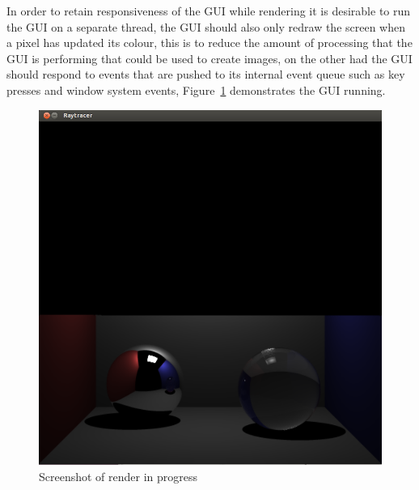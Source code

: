 In order to retain responsiveness of the GUI while rendering it is desirable to run the GUI on a separate thread, the GUI
should also only redraw the screen when a pixel has updated its colour, this is to reduce the amount of processing that
the GUI is performing that could be used to create images, on the other had the GUI should respond to events that are pushed
to its internal event queue such as key presses and window system events, Figure~\ref{fig:gui_screenshot} demonstrates the
GUI running.

\begin{figure}[h]
\centering
\includegraphics[scale=0.24]{./images/gui_screenshot.png}
\caption{Screenshot of render in progress}
\label{fig:gui_screenshot}
\end{figure}
